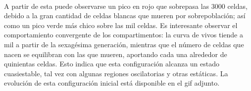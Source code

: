 \documentclass[11pt]{diazessay} %
\begin{document}
\\
A partir de esta puede observarse un pico en rojo que sobrepasa las 3000 celdas, debido a la gran cantidad de celdas blancas que mueren por sobrepoblación; así como un pico verde más chico sobre las mil celdas. Es interesante observar el comportamiento convergente de los compartimentos: la curva de vivos tiende a mil a partir de la sexagésima generación, mientras que el número de celdas que nacen se equilibran con las que mueren, aportando cada una alrededor de quinientas celdas. Esto indica que esta configuración alcanza un estado cuasiestable, tal vez con algunas regiones oscilatorias y otras estáticas. La evolución de esta configuración inicial está disponible en el gif adjunto.
\end{document}
